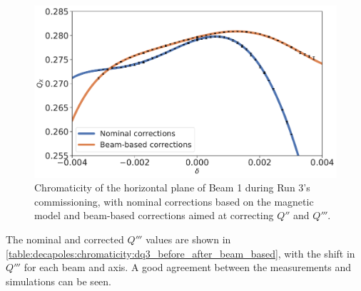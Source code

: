 \begin{figure}[!htb]
    \centering
    \includegraphics[width=0.8\columnwidth]{images/nominal_vs_beam_based_corrections.pdf}
    \caption{Chromaticity of the horizontal plane of Beam 1 during Run 3's commissioning, with
    nominal corrections based on the magnetic model and beam-based corrections aimed at correcting
     $Q''$ and $Q'''$.}
    \label{figure:decapoles:chromaticity:dq3_comparison}
\end{figure}

The nominal and corrected $Q'''$ values are shown in
\cref{table:decapoles:chromaticity:dq3_before_after_beam_based}, with the shift in $Q'''$ for each
beam and axis. A good agreement between the measurements and simulations can be seen.

